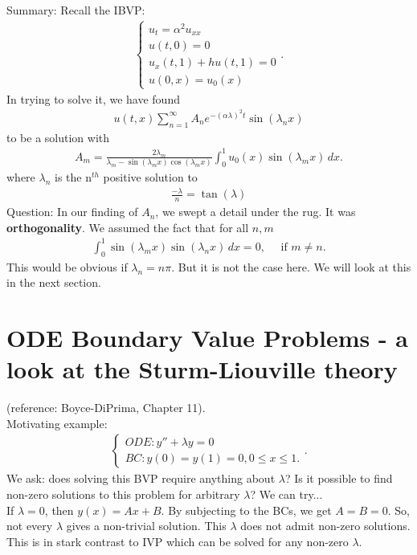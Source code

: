 \documentclass{book}
\theoremstyle{definition}
\begin{document}
\noindent Summary: Recall the IBVP:
\begin{align*}
\begin{cases}
u_t = \alpha^2 u_{xx}\\
u(t,0) = 0\\
u_x(t,1) + hu(t,1) = 0\\
u(0,x) = u_0(x) 
\end{cases}.
\end{align*}
In trying to solve it, we have found
\begin{align*}
u(t,x) \sum_{n=1}^{\infty}A_n e^{-(\alpha \lambda)^2t}\sin(\lambda_n x)
\end{align*}
to be a solution with
\begin{align*}
A_m = \frac{2\lambda_m}{\lambda_m - \sin(\lambda_m x)\cos(\lambda_m x)}\int_{0}^1 u_0(x)\sin(\lambda_m x) \,dx.
\end{align*}
where $\lambda_n$ is the n$^{th}$ positive solution to 
\begin{align*}
\frac{-\lambda}{n}= \tan(\lambda)
\end{align*}
Question: In our finding of $A_n$, we swept a detail under the rug. It was \textbf{orthogonality}. We assumed the fact that for all $n,m$
\begin{align*}
\int^1_0 \sin(\lambda_m x)\sin(\lambda_n x)\,dx = 0,\,\,\,\,\,\,\text{ if } m\neq n.
\end{align*}
This would be obvious if $\lambda_n = n\pi$. But it is not the case here. We will look at this in the next section.
\newpage
\chapter{ODE Boundary Value Problems - a look at the Sturm-Liouville theory}
(reference: Boyce-DiPrima, Chapter 11).\\


Motivating example:
\begin{align*}
\begin{cases}
ODE: y'' + \lambda y = 0\\
BC: y(0) = y(1) = 0, 0\leq x\leq 1.
\end{cases}.
\end{align*}
We ask: does solving this BVP require anything about $\lambda$? Is it possible to find non-zero solutions to this problem for arbitrary $\lambda$? We can try...\\

If $\lambda = 0$, then $y(x) = Ax+B$. By subjecting to the BCs, we get $A=B=0$. So, not every $\lambda$ gives a non-trivial solution. This $\lambda$ does not admit non-zero solutions. This is in stark contrast to IVP which can be solved for any non-zero $\lambda$.\\
\end{document}
